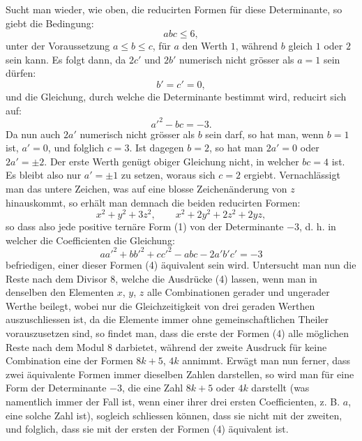\documentclass[11pt]{article}
\begin{document}
Sucht man wieder, wie oben, die reducirten Formen für diese Determinante, so giebt die Bedingung:
\[
 abc\leq 6,
\]
unter der Voraussetzung $a\leq b\leq c$, für $a$ den Werth $1$, während $b$ gleich $1$ oder $2$ sein kann. Es folgt dann, da $2c'$ und $2b'$ numerisch nicht grösser als $a=1$ sein dürfen:
\[
 b'=c'=0,
\]
und die Gleichung, durch welche die Determinante bestimmt wird, reducirt sich auf:
\[
 a'^2-bc=-3.
\]
Da nun auch $2a'$ numerisch nicht grösser als $b$ sein darf, so hat man, wenn $b=1$ ist, $a'=0$, und folglich $c=3$. Ist dagegen $b=2$, so hat man $2a'=0$ oder $2a'=\pm2$. Der erste Werth genügt obiger Gleichung nicht, in welcher $bc=4$ ist. Es bleibt also nur $a'=\pm1$ zu setzen, woraus sich $c=2$ ergiebt. Vernachlässigt man das untere Zeichen, was auf eine blosse Zeichenänderung von $z$ hinauskommt, so erhält man demnach die beiden reducirten Formen:
\begin{equation}\tag{4}
 x^2+y^2+3z^2,\qquad x^2+2y^2+2z^2+2yz,
\end{equation}
so dass also jede positive ternäre Form (1) von der Determinante $-3$, d. h. in welcher die Coefficienten die Gleichung:
\begin{equation}\tag{5}
 aa'^2+bb'^2+cc'^2-abc-2a'b'c'=-3
\end{equation}
befriedigen, einer dieser Formen (4) äquivalent sein wird. Untersucht man nun die Reste nach dem Divisor $8$, welche die Ausdrücke (4) lassen, wenn man in denselben den Elementen $x$, $y$, $z$ alle Combinationen gerader und ungerader Werthe beilegt, wobei nur die Gleichzeitigkeit von drei geraden Werthen auszuschliessen ist, da die Elemente immer ohne gemeinschaftlichen Theiler vorauszusetzen sind, so findet man, dass die erste der Formen (4) alle möglichen Reste nach dem Modul $8$ darbietet, während der zweite Ausdruck für keine Combination eine der Formen $8k+5$, $4k$ annimmt. Erwägt man nun ferner, dass zwei äquivalente Formen immer dieselben Zahlen darstellen, so wird man für eine Form der Determinante $-3$, die eine Zahl $8k+5$ oder $4k$ darstellt (was namentlich immer der Fall ist, wenn einer ihrer drei ersten Coefficienten, z. B. $a$, eine solche Zahl ist), sogleich schliessen können, dass sie nicht mit der zweiten, und folglich, dass sie mit der ersten der Formen (4) äquivalent ist.
\end{document}
